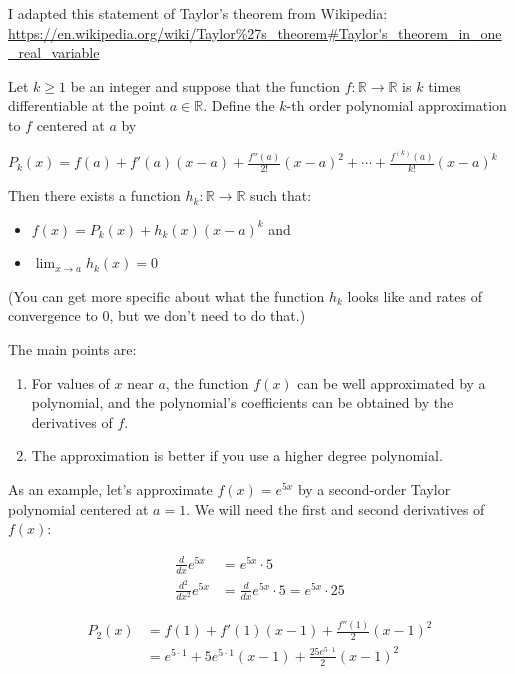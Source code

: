 \documentclass[]{article}
\providecommand{\tightlist}{%
  \setlength{\itemsep}{0pt}\setlength{\parskip}{0pt}}
\begin{document}
I adapted this statement of Taylor's theorem from Wikipedia:
\url{https://en.wikipedia.org/wiki/Taylor\%27s_theorem\#Taylor's_theorem_in_one_real_variable}

Let \(k \geq 1\) be an integer and suppose that the function
\(f: \mathbb{R} \rightarrow \mathbb{R}\) is \(k\) times differentiable
at the point \(a \in \mathbb{R}\). Define the \(k\)-th order polynomial
approximation to \(f\) centered at \(a\) by

\(P_k(x) = f(a) + f'(a) (x - a) + \frac{f''(a)}{2!} (x - a)^2 + \cdots + \frac{f^{(k)}(a)}{k!}(x - a)^k\)

Then there exists a function \(h_k: \mathbb{R} \rightarrow \mathbb{R}\)
such that:

\begin{itemize}
\item $f(x) = P_k(x) + h_k(x) (x - a)^k$ and
\item $\lim_{x \rightarrow a} h_k(x) = 0$
\end{itemize}

(You can get more specific about what the function \(h_k\) looks like
and rates of convergence to 0, but we don't need to do that.)

The main points are:

\begin{enumerate}
\def\labelenumi{\arabic{enumi}.}
\tightlist
\item
  For values of \(x\) near \(a\), the function \(f(x)\) can be well
  approximated by a polynomial, and the polynomial's coefficients can be
  obtained by the derivatives of \(f\).
\item
  The approximation is better if you use a higher degree polynomial.
\end{enumerate}

\newpage

As an example, let's approximate \(f(x) = e^{5x}\) by a second-order
Taylor polynomial centered at \(a = 1\). We will need the first and
second derivatives of \(f(x)\):

\begin{align*}
\frac{d}{dx} e^{5x} &= e^{5x} \cdot 5 \\
\frac{d^2}{dx^2} e^{5x} &= \frac{d}{dx} e^{5x} \cdot 5 = e^{5x} \cdot 25
\end{align*}

\begin{align*}
P_2(x) &= f(1) + f'(1) (x - 1) + \frac{f''(1)}{2} (x - 1)^2 \\
&= e^{5 \cdot 1} + 5 e^{5 \cdot 1}(x - 1) + \frac{25 e^{5 \cdot 1}}{2}(x - 1)^2
\end{align*}
\end{document}
